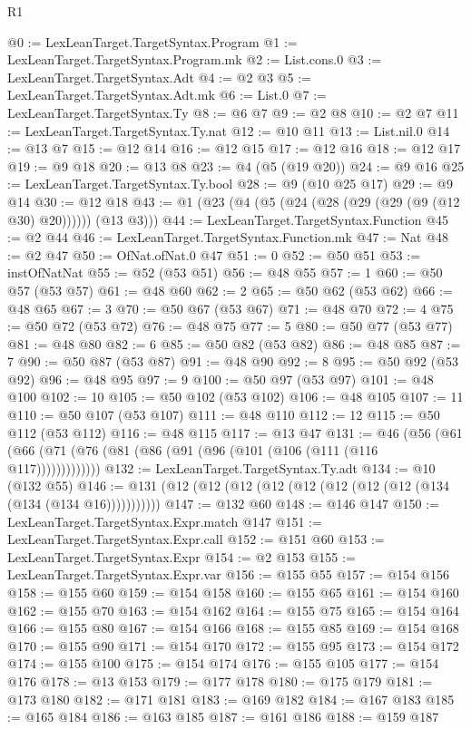 \begin{lexlean}{R1}
\begin{coremodule}
@0 := LexLeanTarget.TargetSyntax.Program
@1 := LexLeanTarget.TargetSyntax.Program.mk
@2 := List.cons.{0}
@3 := LexLeanTarget.TargetSyntax.Adt
@4 := @2 @3
@5 := LexLeanTarget.TargetSyntax.Adt.mk
@6 := List.{0}
@7 := LexLeanTarget.TargetSyntax.Ty
@8 := @6 @7
@9 := @2 @8
@10 := @2 @7
@11 := LexLeanTarget.TargetSyntax.Ty.nat
@12 := @10 @11
@13 := List.nil.{0}
@14 := @13 @7
@15 := @12 @14
@16 := @12 @15
@17 := @12 @16
@18 := @12 @17
@19 := @9 @18
@20 := @13 @8
@23 := @4 (@5 (@19 @20))
@24 := @9 @16
@25 := LexLeanTarget.TargetSyntax.Ty.bool
@28 := @9 (@10 @25 @17)
@29 := @9 @14
@30 := @12 @18
@43 := @1 (@23 (@4 (@5 (@24 (@28 (@29 (@29 (@9 (@12 @30) @20)))))) (@13 @3)))
@44 := LexLeanTarget.TargetSyntax.Function
@45 := @2 @44
@46 := LexLeanTarget.TargetSyntax.Function.mk
@47 := Nat
@48 := @2 @47
@50 := OfNat.ofNat.{0} @47
@51 := 0
@52 := @50 @51
@53 := instOfNatNat
@55 := @52 (@53 @51)
@56 := @48 @55
@57 := 1
@60 := @50 @57 (@53 @57)
@61 := @48 @60
@62 := 2
@65 := @50 @62 (@53 @62)
@66 := @48 @65
@67 := 3
@70 := @50 @67 (@53 @67)
@71 := @48 @70
@72 := 4
@75 := @50 @72 (@53 @72)
@76 := @48 @75
@77 := 5
@80 := @50 @77 (@53 @77)
@81 := @48 @80
@82 := 6
@85 := @50 @82 (@53 @82)
@86 := @48 @85
@87 := 7
@90 := @50 @87 (@53 @87)
@91 := @48 @90
@92 := 8
@95 := @50 @92 (@53 @92)
@96 := @48 @95
@97 := 9
@100 := @50 @97 (@53 @97)
@101 := @48 @100
@102 := 10
@105 := @50 @102 (@53 @102)
@106 := @48 @105
@107 := 11
@110 := @50 @107 (@53 @107)
@111 := @48 @110
@112 := 12
@115 := @50 @112 (@53 @112)
@116 := @48 @115
@117 := @13 @47
@131 := @46 (@56 (@61 (@66 (@71 (@76 (@81 (@86 (@91 (@96 (@101 (@106 (@111 (@116 @117)))))))))))))
@132 := LexLeanTarget.TargetSyntax.Ty.adt
@134 := @10 (@132 @55)
@146 := @131 (@12 (@12 (@12 (@12 (@12 (@12 (@12 (@12 (@134 (@134 (@134 @16)))))))))))
@147 := @132 @60
@148 := @146 @147
@150 := LexLeanTarget.TargetSyntax.Expr.match @147
@151 := LexLeanTarget.TargetSyntax.Expr.call
@152 := @151 @60
@153 := LexLeanTarget.TargetSyntax.Expr
@154 := @2 @153
@155 := LexLeanTarget.TargetSyntax.Expr.var
@156 := @155 @55
@157 := @154 @156
@158 := @155 @60
@159 := @154 @158
@160 := @155 @65
@161 := @154 @160
@162 := @155 @70
@163 := @154 @162
@164 := @155 @75
@165 := @154 @164
@166 := @155 @80
@167 := @154 @166
@168 := @155 @85
@169 := @154 @168
@170 := @155 @90
@171 := @154 @170
@172 := @155 @95
@173 := @154 @172
@174 := @155 @100
@175 := @154 @174
@176 := @155 @105
@177 := @154 @176
@178 := @13 @153
@179 := @177 @178
@180 := @175 @179
@181 := @173 @180
@182 := @171 @181
@183 := @169 @182
@184 := @167 @183
@185 := @165 @184
@186 := @163 @185
@187 := @161 @186
@188 := @159 @187

\end{coremodule}
\end{lexlean}
